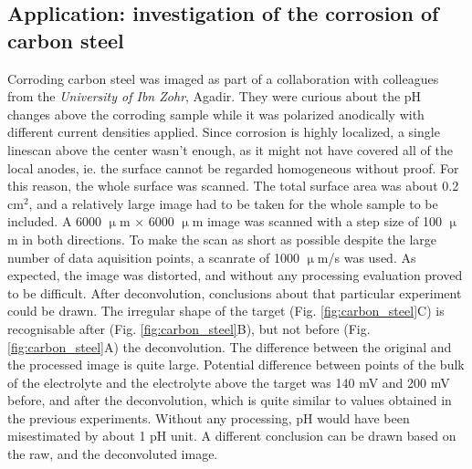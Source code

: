 		\subsection{Application: investigation of the corrosion of carbon steel}
Corroding carbon steel was imaged as part of a collaboration with colleagues from the \emph{University of Ibn Zohr}, Agadir.
They were curious about the pH changes above the corroding sample while it was polarized anodically with different current densities applied.
Since corrosion is highly localized, a single linescan above the center wasn't enough, as it might not have covered all of the local anodes, ie. the surface cannot be regarded homogeneous without proof.
For this reason, the whole surface was scanned.
The total surface area was about 0.2 cm$^2$, and a relatively large image had to be taken for the whole sample to be included.
A 6000 $\upmu$m $\times$ 6000 $\upmu$m image was scanned with a step size of 100 $\upmu$m in both directions.
To make the scan as short as possible despite the large number of data aquisition points, a scanrate of 1000 $\upmu$m/s was used.
As expected, the image was distorted, and without any processing evaluation proved to be difficult.
After deconvolution, conclusions about that particular experiment could be drawn.
The irregular shape of the target (Fig. \ref{fig:carbon_steel}C) is recognisable after (Fig. \ref{fig:carbon_steel}B), but not before (Fig. \ref{fig:carbon_steel}A) the deconvolution.
The difference between the original and the processed image is quite large.
Potential difference between points of the bulk of the electrolyte and the electrolyte above the target was 140 mV and 200 mV before, and after the deconvolution, which is quite similar to values obtained in the previous experiments.
Without any processing, pH would have been misestimated by about 1 pH unit.
A different conclusion can be drawn based on the raw, and the deconvoluted image.

